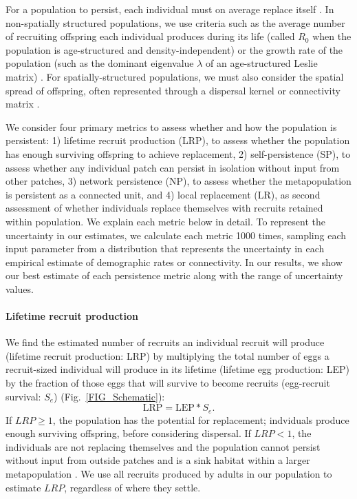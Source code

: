 \documentclass[12pt, oneside]{article}   	%
\begin{document}
For a population to persist, each individual must on average replace itself \citep[e.g.][]{hastings_persistence_2006, botsford2019population}. In non-spatially structured populations, we use criteria such as the average number of recruiting offspring each individual produces during its life (called $R_0$ when the population is age-structured and density-independent) or the growth rate of the population (such as the dominant eigenvalue $\lambda$ of an age-structured Leslie matrix) \citep{caswell_matrix_2001, burgess2014beyond}. For spatially-structured populations, we must also consider the spatial spread of offspring, often represented through a dispersal kernel or connectivity matrix \citep{burgess2014beyond}. %

We consider four primary metrics to assess whether and how the population is persistent: 1) lifetime recruit production (LRP), to assess whether the population has enough surviving offspring to achieve replacement, 2) self-persistence (SP), to assess whether any individual patch can persist in isolation without input from other patches, 3) network persistence (NP), to assess whether the metapopulation is persistent as a connected unit, and 4) local replacement (LR), as second assessment of whether individuals replace themselves with recruits retained within population. We explain each metric below in detail. To represent the uncertainty in our estimates, we calculate each metric 1000 times, sampling each input parameter from a distribution that represents the uncertainty in each empirical estimate of demographic rates or connectivity. In our results, we show our best estimate of each persistence metric along with the range of uncertainty values. %

\paragraph*{Lifetime recruit production}

We find the estimated number of recruits an individual recruit will produce (lifetime recruit production: LRP) by multiplying the total number of eggs a recruit-sized individual will produce in its lifetime (lifetime egg production: LEP) by the fraction of those eggs that will survive to become recruits (egg-recruit survival: $S_e$) (Fig.\ \ref{FIG_Schematic}):
\begin{equation}
\text{LRP} = \text{LEP} * S_e. \label{EQN_LRP}
\end{equation}
If $LRP \geq 1$, the population has the potential for replacement; indviduals produce enough surviving offspring, before considering dispersal. If $LRP < 1$, the individuals are not replacing themselves and the population cannot persist without input from outside patches and is a sink habitat within a larger metapopulation \citep{pulliam1988sources}. We use all recruits produced by adults in our population to estimate $LRP$, regardless of where they settle.
\end{document}
